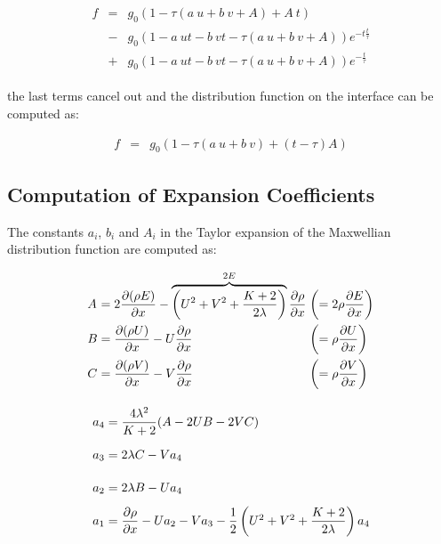 \documentclass[
	pdftex,             %
	12pt,				%
	a4paper,		   	%
	english,				%
	oneside,			%
]{article}
\begin{document}
\begin{equation}
\begin{split}
\begin{array}{lcll}
f
&=&
g_0 \left( 1 - \tau (a~u + b~v + A) + A~t \right)
\\
&-&
g_0 \left( 1 - a~ut - b~vt - \tau(a~u + b~v + A) \right) e^{-t\tfrac{t}{\tau}}
\\
&+& 
g_0 \left( 1 - a~ut - b~vt - \tau \left( a~u + b~v + A \right) \right) e^{-\tfrac{t}{\tau}}
\end{array}
\end{split}
\end{equation}

the last terms cancel out and the distribution function on the interface can be computed as:

\begin{equation}
\begin{array}{lcl}
f &=& g_0 \left( 1 - \tau (a~u + b~v) + (t-\tau)A \right)
\end{array}
\end{equation}

\clearpage

\subsection*{Computation of Expansion Coefficients}

The constants $a_i$, $b_i$ and $A_i$ in the Taylor expansion of the Maxwellian distribution function are computed as:

\begin{eqnarray}
\begin{split}
\arraycolsep=1.4pt\def\arraystretch{2.2}
\begin{array}{lcll}
A &=& 2 \dfrac{\partial (\rho E)}{\partial x} 
  - \overbrace{ \left( U^2 + V^2 + \dfrac{K+2}{2\lambda} \right) }^{2E} \dfrac{\partial\rho}{\partial x}
    &\left( = 2 \rho \dfrac{\partial E}{\partial x} \right)
\\
B &=& \dfrac{\partial (\rho U)}{\partial x} - U\dfrac{\partial \rho}{\partial x}
	&\left( = \rho \dfrac{\partial U}{\partial x} \right)
\\
C &=& \dfrac{\partial (\rho V)}{\partial x} - V\dfrac{\partial \rho}{\partial x}
	&\left( = \rho \dfrac{\partial V}{\partial x} \right)
\end{array}
\end{split}
\end{eqnarray}

\begin{eqnarray}
\begin{split}
\arraycolsep=1.4pt\def\arraystretch{2.2}
\begin{array}{lcl}
a_4 &=& \dfrac{4 \lambda^2}{K+2} ( A - 2 U B - 2 V C )
\\
a_3 &=& 2 \lambda C - V a_4
\\
a_2 &=& 2 \lambda B - U a_4
\\
a_1 &=& \dfrac{\partial \rho}{\partial x} - U a_2 - V a_3 - \dfrac{1}{2} \left( U^2 + V^2 + \dfrac{K+2}{2\lambda} \right) a_4
\end{array}
\end{split}
\end{eqnarray}
\end{document}
